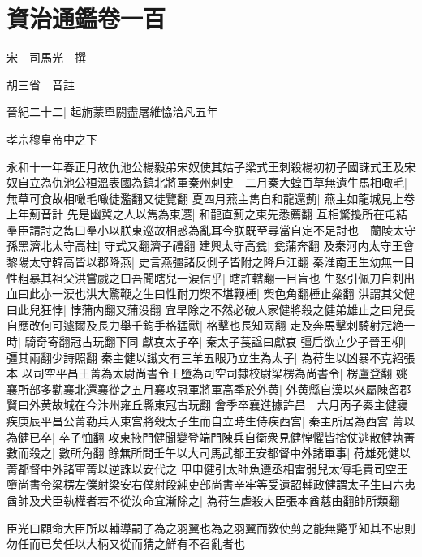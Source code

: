 \section{資治通鑑卷一百}
宋　司馬光　撰

胡三省　音註

晉紀二十二|{
	起旃蒙單閼盡屠維恊洽凡五年}


孝宗穆皇帝中之下

永和十一年春正月故仇池公楊毅弟宋奴使其姑子梁式王刺殺楊初初子國誅式王及宋奴自立為仇池公桓溫表國為鎮北將軍秦州刺史　二月秦大蝗百草無遺牛馬相噉毛|{
	無草可食故相噉毛噉徒濫翻又徒覽翻}
夏四月燕主雋自和龍還薊|{
	燕主如龍城見上卷上年薊音計}
先是幽冀之人以雋為東遷|{
	和龍直薊之東先悉薦翻}
互相驚擾所在屯結羣臣請討之雋曰羣小以朕東巡故相惑為亂耳今朕既至尋當自定不足討也　蘭陵太守孫黑濟北太守高柱|{
	守式又翻濟子禮翻}
建興太守高瓫|{
	瓫蒲奔翻}
及秦河内太守王會黎陽太守韓高皆以郡降燕|{
	史言燕彊諸反側子皆附之降戶江翻}
秦淮南王生幼無一目性粗暴其祖父洪嘗戲之曰吾聞瞎兒一涙信乎|{
	瞎許轄翻一目盲也}
生怒引佩刀自刺出血曰此亦一涙也洪大驚鞭之生曰性耐刀槊不堪鞭棰|{
	槊色角翻棰止橤翻}
洪謂其父健曰此兒狂悖|{
	悖蒲内翻又蒲没翻}
宜早除之不然必破人家健將殺之健弟雄止之曰兒長自應改何可遽爾及長力舉千鈞手格猛獸|{
	格擊也長知兩翻}
走及奔馬擊刺騎射冠絶一時|{
	騎奇寄翻冠古玩翻下同}
獻哀太子卒|{
	秦太子萇諡曰獻哀}
彊后欲立少子晉王柳|{
	彊其兩翻少詩照翻}
秦主健以䜟文有三羊五眼乃立生為太子|{
	為苻生以凶暴不克紹張本}
以司空平昌王菁為太尉尚書令王墮為司空司隸校尉梁楞為尚書令|{
	楞盧登翻}
姚襄所部多勸襄北還襄從之五月襄攻冠軍將軍高季於外黄|{
	外黄縣自漢以來屬陳留郡賢曰外黄故城在今汴州雍丘縣東冠古玩翻}
會季卒襄進據許昌　六月丙子秦主健寢疾庚辰平昌公菁勒兵入東宫將殺太子生而自立時生侍疾西宫|{
	秦主所居為西宫}
菁以為健已卒|{
	卒子恤翻}
攻東掖門健聞變登端門陳兵自衛衆見健惶懼皆捨仗逃散健執菁數而殺之|{
	數所角翻}
餘無所問壬午以大司馬武都王安都督中外諸軍事|{
	苻雄死健以菁都督中外諸軍菁以逆誅以安代之}
甲申健引太師魚遵丞相雷弱兒太傅毛貴司空王墮尚書令梁楞左㒒射梁安右僕射段純吏部尚書辛牢等受遺詔輔政健謂太子生曰六夷酋帥及犬臣執權者若不從汝命宜漸除之|{
	為苻生虐殺大臣張本酋慈由翻帥所類翻}


臣光曰顧命大臣所以輔導嗣子為之羽翼也為之羽翼而敎使剪之能無斃乎知其不忠則勿任而已矣任以大柄又從而猜之鮮有不召亂者也

